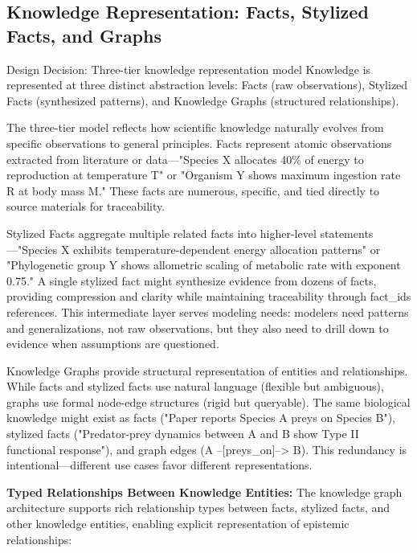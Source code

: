 \documentclass[12pt,a4paper]{article}
\begin{document}
\subsection{Knowledge Representation: Facts, Stylized Facts, and Graphs}

\begin{rationale}{Design Decision: Three-tier knowledge representation model}
Knowledge is represented at three distinct abstraction levels: Facts (raw observations), Stylized Facts (synthesized patterns), and Knowledge Graphs (structured relationships).
\end{rationale}

The three-tier model reflects how scientific knowledge naturally evolves from specific observations to general principles. Facts represent atomic observations extracted from literature or data—"Species X allocates 40\% of energy to reproduction at temperature T" or "Organism Y shows maximum ingestion rate R at body mass M." These facts are numerous, specific, and tied directly to source materials for traceability.

Stylized Facts aggregate multiple related facts into higher-level statements—"Species X exhibits temperature-dependent energy allocation patterns" or "Phylogenetic group Y shows allometric scaling of metabolic rate with exponent 0.75." A single stylized fact might synthesize evidence from dozens of facts, providing compression and clarity while maintaining traceability through fact\_ids references. This intermediate layer serves modeling needs: modelers need patterns and generalizations, not raw observations, but they also need to drill down to evidence when assumptions are questioned.

Knowledge Graphs provide structural representation of entities and relationships. While facts and stylized facts use natural language (flexible but ambiguous), graphs use formal node-edge structures (rigid but queryable). The same biological knowledge might exist as facts ("Paper reports Species A preys on Species B"), stylized facts ("Predator-prey dynamics between A and B show Type II functional response"), and graph edges (A --[preys\_on]--> B). This redundancy is intentional—different use cases favor different representations.

\textbf{Typed Relationships Between Knowledge Entities:} The knowledge graph architecture supports rich relationship types between facts, stylized facts, and other knowledge entities, enabling explicit representation of epistemic relationships:
\end{document}
